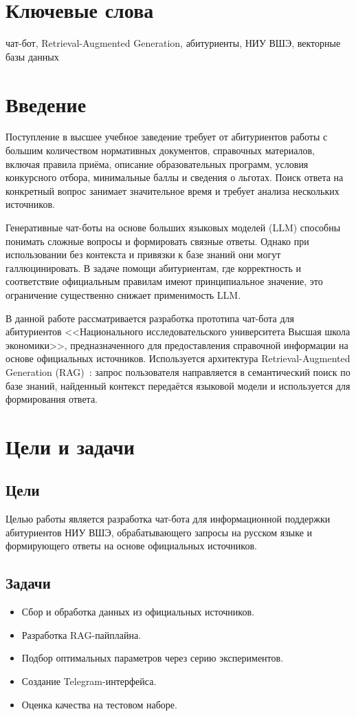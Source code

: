\documentclass[a4paper,12pt]{extarticle}
\begin{document}
\section*{Ключевые слова}
чат-бот, Retrieval-Augmented Generation, абитуриенты, НИУ ВШЭ, векторные базы данных

\pagebreak

\section{Введение}
Поступление в высшее учебное заведение требует от абитуриентов работы с большим количеством нормативных документов, справочных материалов, включая правила приёма, описание образовательных программ, условия конкурсного отбора, минимальные баллы и сведения о льготах. Поиск ответа на конкретный вопрос занимает значительное время и требует анализа нескольких источников.

Генеративные чат-боты на основе больших языковых моделей (LLM) способны понимать сложные вопросы и формировать связные ответы. Однако при использовании без контекста и привязки к базе знаний они могут галлюцинировать. В задаче помощи абитуриентам, где корректность и соответствие официальным правилам имеют принципиальное значение, это ограничение существенно снижает применимость LLM.

В данной работе рассматривается разработка прототипа чат-бота для абитуриентов <<Национального исследовательского университета Высшая школа экономики>>, предназначенного для предоставления справочной информации на основе официальных источников. Используется архитектура Retrieval-Augmented Generation (RAG)~\cite{ctan,rag}: запрос пользователя направляется в семантический поиск по базе знаний, найденный контекст передаётся языковой модели и используется для формирования ответа.

\section{Цели и задачи}

\subsection{Цели}
Целью работы является разработка чат-бота для информационной поддержки абитуриентов НИУ ВШЭ, обрабатывающего запросы на русском языке и формирующего ответы на основе официальных источников.

\subsection{Задачи}
\begin{itemize}
    \item Сбор и обработка данных из официальных источников.
    \item Разработка RAG-пайплайна.
    \item Подбор оптимальных параметров через серию экспериментов.
    \item Создание Telegram-интерфейса.
    \item Оценка качества на тестовом наборе.
\end{itemize}
\end{document}
